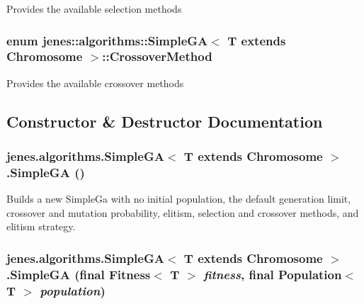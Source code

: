 Provides the available selection methods \hypertarget{classjenes_1_1algorithms_1_1_simple_g_a_3_01_t_01extends_01_chromosome_01_4_d015c6a036c7234fe34a1a78fc3c55bf}{
\subsubsection[CrossoverMethod]{\setlength{\rightskip}{0pt plus 5cm}enum jenes::algorithms::SimpleGA$<$ T extends Chromosome $>$::{\bf CrossoverMethod}}}
\label{classjenes_1_1algorithms_1_1_simple_g_a_3_01_t_01extends_01_chromosome_01_4_d015c6a036c7234fe34a1a78fc3c55bf}


Provides the available crossover methods 

\subsection{Constructor \& Destructor Documentation}
\hypertarget{classjenes_1_1algorithms_1_1_simple_g_a_3_01_t_01extends_01_chromosome_01_4_706a621e21564095963264fdfd2eba32}{
\subsubsection[SimpleGA]{\setlength{\rightskip}{0pt plus 5cm}jenes.algorithms.SimpleGA$<$ T extends Chromosome $>$.SimpleGA ()}}
\label{classjenes_1_1algorithms_1_1_simple_g_a_3_01_t_01extends_01_chromosome_01_4_706a621e21564095963264fdfd2eba32}


Builds a new SimpleGa with no initial population, the default generation limit, crossover and mutation probability, elitism, selection and crossover methods, and elitism strategy. \hypertarget{classjenes_1_1algorithms_1_1_simple_g_a_3_01_t_01extends_01_chromosome_01_4_44ee069daad5aaed809b2d83303052e0}{
\subsubsection[SimpleGA]{\setlength{\rightskip}{0pt plus 5cm}jenes.algorithms.SimpleGA$<$ T extends Chromosome $>$.SimpleGA (final Fitness$<$ T $>$ {\em fitness}, \/  final Population$<$ T $>$ {\em population})}}
\label{classjenes_1_1algorithms_1_1_simple_g_a_3_01_t_01extends_01_chromosome_01_4_44ee069daad5aaed809b2d83303052e0}


